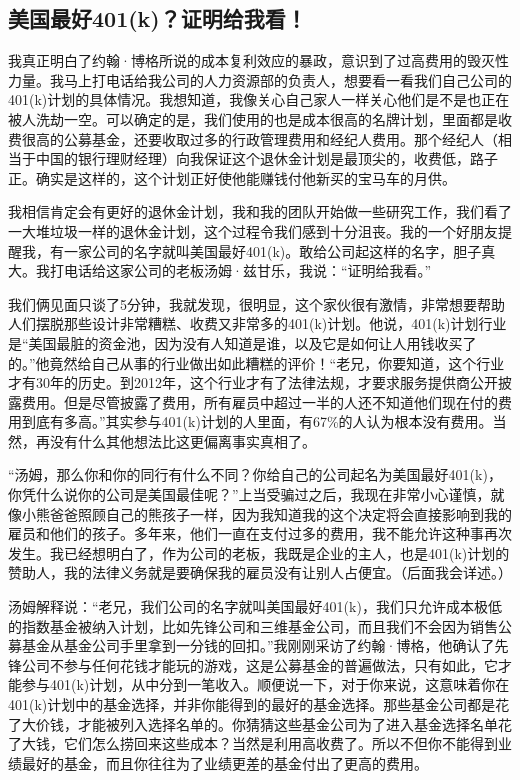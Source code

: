 \subsection{美国最好401(k)？证明给我看！}

我真正明白了约翰·博格所说的成本复利效应的暴政，意识到了过高费用的毁灭性力量。我马上打电话给我公司的人力资源部的负责人，想要看一看我们自己公司的401(k)计划的具体情况。我想知道，我像关心自己家人一样关心他们是不是也正在被人洗劫一空。可以确定的是，我们使用的也是成本很高的名牌计划，里面都是收费很高的公募基金，还要收取过多的行政管理费用和经纪人费用。那个经纪人（相当于中国的银行理财经理）向我保证这个退休金计划是最顶尖的，收费低，路子正。确实是这样的，这个计划正好使他能赚钱付他新买的宝马车的月供。

我相信肯定会有更好的退休金计划，我和我的团队开始做一些研究工作，我们看了一大堆垃圾一样的退休金计划，这个过程令我们感到十分沮丧。我的一个好朋友提醒我，有一家公司的名字就叫美国最好401(k)。敢给公司起这样的名字，胆子真大。我打电话给这家公司的老板汤姆·兹甘乐，我说：“证明给我看。”

我们俩见面只谈了5分钟，我就发现，很明显，这个家伙很有激情，非常想要帮助人们摆脱那些设计非常糟糕、收费又非常多的401(k)计划。他说，401(k)计划行业是“美国最脏的资金池，因为没有人知道是谁，以及它是如何让人用钱收买了的。”他竟然给自己从事的行业做出如此糟糕的评价！“老兄，你要知道，这个行业才有30年的历史。到2012年，这个行业才有了法律法规，才要求服务提供商公开披露费用。但是尽管披露了费用，所有雇员中超过一半的人还不知道他们现在付的费用到底有多高。”其实参与401(k)计划的人里面，有67\%的人认为根本没有费用。当然，再没有什么其他想法比这更偏离事实真相了。

“汤姆，那么你和你的同行有什么不同？你给自己的公司起名为美国最好401(k)，你凭什么说你的公司是美国最佳呢？”上当受骗过之后，我现在非常小心谨慎，就像小熊爸爸照顾自己的熊孩子一样，因为我知道我的这个决定将会直接影响到我的雇员和他们的孩子。多年来，他们一直在支付过多的费用，我不能允许这种事再次发生。我已经想明白了，作为公司的老板，我既是企业的主人，也是401(k)计划的赞助人，我的法律义务就是要确保我的雇员没有让别人占便宜。（后面我会详述。）

汤姆解释说：“老兄，我们公司的名字就叫美国最好401(k)，我们只允许成本极低的指数基金被纳入计划，比如先锋公司和三维基金公司，而且我们不会因为销售公募基金从基金公司手里拿到一分钱的回扣。”我刚刚采访了约翰·博格，他确认了先锋公司不参与任何花钱才能玩的游戏，这是公募基金的普遍做法，只有如此，它才能参与401(k)计划，从中分到一笔收入。顺便说一下，对于你来说，这意味着你在401(k)计划中的基金选择，并非你能得到的最好的基金选择。那些基金公司都是花了大价钱，才能被列入选择名单的。你猜猜这些基金公司为了进入基金选择名单花了大钱，它们怎么捞回来这些成本？当然是利用高收费了。所以不但你不能得到业绩最好的基金，而且你往往为了业绩更差的基金付出了更高的费用。

